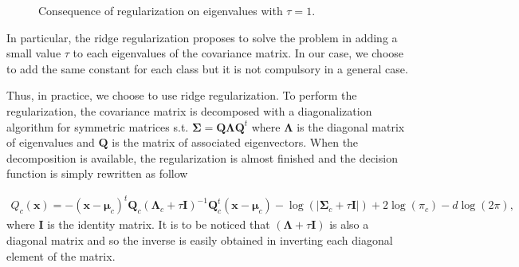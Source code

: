 \documentclass[a4paper,11pt,DIV=16,abstracton]{scrartcl}
\begin{document}
        \begin{figure}[!ht]
            \centering
            \caption{Consequence of regularization on eigenvalues with $\tau=1$.\label{fig:eigenvalues}}
        \end{figure}


        In particular, the ridge regularization proposes to solve the problem in adding a small value $\tau$ to each eigenvalues of the covariance matrix. In our case, we choose to add the same constant for each class but it is not compulsory in a general case.

        Thus, in practice, we choose to use ridge regularization. To perform the regularization, the covariance matrix is decomposed with a diagonalization algorithm for symmetric matrices s.t. $\boldsymbol{\Sigma} = \mathbf{Q} \boldsymbol{\Lambda} \mathbf{Q}^t$ where $\boldsymbol{\Lambda}$ is the diagonal matrix of eigenvalues and $\mathbf{Q}$ is the matrix of associated eigenvectors. When the decomposition is available, the regularization is almost finished and the decision function is simply rewritten as follow

        \begin{align}
        \label{eq:decision-ridge}
            Q_c(\mathbf{x}) = - (\mathbf{x} - \boldsymbol{\mu}_c)^t \mathbf{Q}_c (\boldsymbol{\Lambda}_c + \tau \mathbf{I})^{-1} \mathbf{Q}_c^t (\mathbf{x} - \boldsymbol{\mu}_c) - \log (|\boldsymbol{\Sigma}_c + \tau \mathbf{I}|) + 2 \log (\pi_c) - d \log (2\pi),
        \end{align}
        where $\mathbf{I}$ is the identity matrix. It is to be noticed that $(\boldsymbol{\Lambda} + \tau \mathbf{I})$ is also a diagonal matrix and so the inverse is easily obtained in inverting each diagonal element of the matrix.
\end{document}
